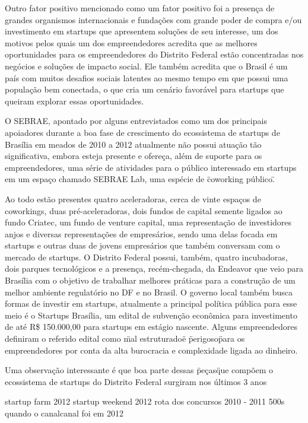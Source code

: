 Outro fator positivo mencionado como um fator positivo foi a presença de grandes organismos internacionais e fundações com grande poder de compra e/ou investimento em startups que apresentem soluções de seu interesse, um dos motivos pelos quais um dos empreendedores acredita que as melhores oportunidades para os empreendedores do Distrito Federal estão concentradas nos negócios e soluções de impacto social. Ele também acredita que o Brasil é um país com muitos desafios sociais latentes ao mesmo tempo em que possui uma população bem conectada, o que cria um cenário favorável para startups que queiram explorar essas oportunidades.

O SEBRAE, apontado por alguns entrevistados como um dos principais apoiadores durante a boa fase de crescimento do ecossistema de startups de Brasília em meados de 2010 a 2012 atualmente não possui atuação tão significativa, embora esteja presente e ofereça, além de suporte para os empreendedores, uma série de atividades para o público interessado em startups em um espaço chamado SEBRAE Lab, uma espécie de \"coworking público\".

Ao todo estão presentes quatro aceleradoras, cerca de vinte espaços de coworkings, duas pré-aceleradoras, dois fundos de capital semente ligados ao fundo Criatec, um fundo de venture capital, uma representação de investidores anjos e diversas representações de empresários, sendo uma delas focada em startups e outras duas de jovens empresários que também conversam com o mercado de startups. O Distrito Federal possui, também, quatro incubadoras, dois parques tecnológicos e a presença, recém-chegada, da Endeavor que veio para Brasília com o objetivo de trabalhar melhores práticas para a construção de um melhor ambiente regulatório no DF e no Brasil. O governo local também busca formas de investir em startups, atualmente a principal política pública para esse meio é o Startups Brasília, um edital de subvenção econômica para investimento de até R\$ 150.000,00 para startups em estágio nascente. Alguns empreendedores definiram o referido edital como \"mal estruturado\" e \"perigoso\" para os empreendedores por conta da alta burocracia e complexidade ligada ao dinheiro.

Uma observação interessante é que boa parte dessas \"peças\" que compõem o ecossistema de startups do Distrito Federal surgiram nos últimos 3 anos

startup farm 2012
startup weekend 2012
rota dos concursos 2010 - 2011 500s
quando o canalcanal foi em 2012

